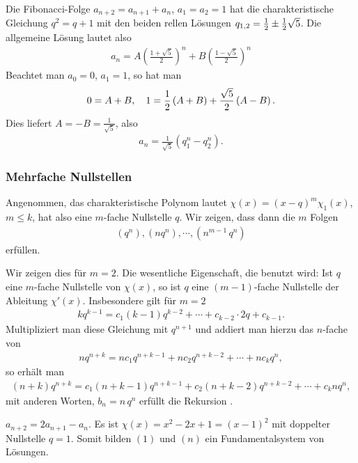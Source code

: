 \documentclass[11pt,a4paper]{article}
\begin{document}
\begin{beispiel} Die Fibonacci-Folge $a_{n+2}=a_{n+1} +a_n$, $a_1=a_2=1$ hat die 
charakteristische Gleichung $q^2 =q+1 $ mit den beiden rellen Lösungen $q_{1,2}
=\frac{1}{2} \pm \frac{1}{2} \sqrt{5}$. Die allgemeine Lösung lautet also
\begin{gather*}
a_n=A \left(\frac{1+\sqrt{5}}{2}\right)^n +B \left(\frac{1-\sqrt{5}}{2}\right)^n
\end{gather*}
Beachtet man $a_0=0$, $a_1=1$, so hat man
\begin{gather*}
0=A+B,\quad 1=\frac{1}{2}\left(A+B\right) +\frac{\sqrt{5}}{2}\left(A-B\right).
\end{gather*}
Dies liefert $A=-B=\frac{1}{\sqrt{5}}$, also
\begin{gather*}
a_n=\frac{1}{\sqrt{5}} \left(q_1^n -q_2^n\right).
\end{gather*}
\end{beispiel}

\subsubsection{Mehrfache Nullstellen}
Angenommen, das charakteristische Polynom lautet $\chi(x)=(x-q)^m\chi_1(x)$,
$m\le k$, hat also eine $m$-fache Nullstelle $q$. Wir zeigen, dass dann die $m$
Folgen
\begin{gather*}
(q^n), (nq^n),\cdots, (n^{m-1} \, q^n)
\end{gather*}
\rf[e-linrek] erfüllen.

Wir zeigen dies für $m=2$. Die wesentliche Eigenschaft, die benutzt wird: Ist
$q$ eine $m$-fache Nullstelle von $\chi(x) $, so ist $q$ eine $(m-1)$-fache
Nullstelle der Ableitung $\chi'(x)$.  Insbesondere gilt für $m=2$
\begin{gather*}
kq^{k-1}= c_1 (k-1)q^{k-2} +\cdots + c_{k-2} \cdot 2q +c_{k-1}.
\end{gather*}
Multipliziert man diese Gleichung mit $q^{n+1}$ und addiert man hierzu
das $n$-fache von  \rf[e-char1]
\begin{gather*}
n q^{n+k} = nc_1 q^{n+k-1} +nc_2 q^{n+k-2} +\cdots +n c_k q^n,
\end{gather*}
so erhält man
\begin{gather*}
(n+k)q^{n+k} = c_1 (n+k-1)q^{n+k-1} +c_2 (n+k-2)q^{n+k-2} +\cdots + c_k nq^n,
\end{gather*}
mit anderen Worten, $b_n= n\, q^n $ erfüllt die Rekursion \rf[e-linrek].

\begin{beispiel} 
$a_{n+2}=2a_{n+1} -a_n$. Es ist $\chi(x)=x^2 -2x +1=(x-1)^2 $ mit doppelter
  Nullstelle $q=1$. Somit bilden $(1) $ und $(n)$ ein Fundamentalsystem von
  Lösungen.
\end{beispiel}
\end{document}

